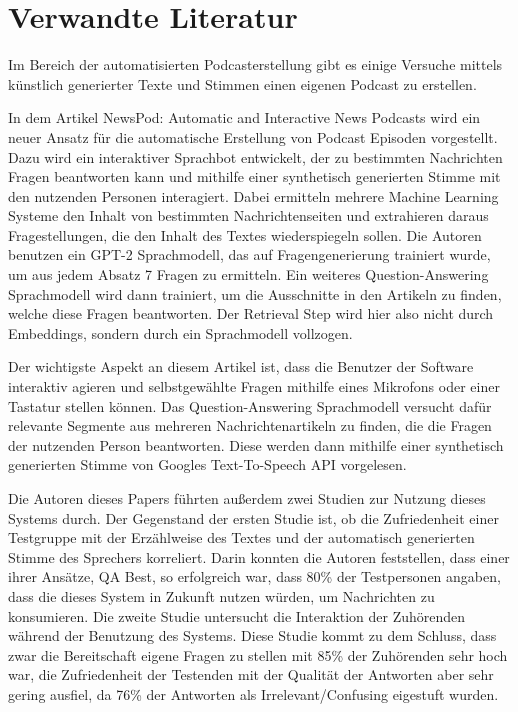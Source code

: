\chapter{Verwandte Literatur}\label{ch:theoretical}

Im Bereich der automatisierten Podcasterstellung gibt es einige Versuche mittels künstlich generierter Texte und Stimmen einen eigenen Podcast zu erstellen.

In dem Artikel \glqq NewsPod: Automatic and Interactive News Podcasts\grqq{} wird ein neuer Ansatz für die automatische Erstellung von Podcast Episoden vorgestellt. 
Dazu wird ein interaktiver Sprachbot entwickelt, der zu bestimmten Nachrichten Fragen beantworten kann und mithilfe einer synthetisch generierten Stimme mit den nutzenden Personen interagiert.
Dabei ermitteln mehrere Machine Learning Systeme den Inhalt von bestimmten Nachrichtenseiten und extrahieren daraus Fragestellungen, die den Inhalt des Textes wiederspiegeln sollen. 
Die Autoren benutzen ein GPT-2 Sprachmodell, das auf Fragengenerierung trainiert wurde, um aus jedem Absatz 7 Fragen zu ermitteln. 
Ein weiteres Question-Answering Sprachmodell wird dann trainiert, um die Ausschnitte in den Artikeln zu finden, welche diese Fragen beantworten.  
Der Retrieval Step wird hier also nicht durch Embeddings, sondern durch ein Sprachmodell vollzogen.

Der wichtigste Aspekt an diesem Artikel ist, dass die Benutzer der Software interaktiv agieren und selbstgewählte Fragen mithilfe eines Mikrofons oder einer Tastatur stellen können.
Das Question-Answering Sprachmodell versucht dafür relevante Segmente aus mehreren Nachrichtenartikeln zu finden, die die Fragen der nutzenden Person beantworten.
Diese werden dann mithilfe einer synthetisch generierten Stimme von Googles Text-To-Speech API vorgelesen.

Die Autoren dieses Papers führten außerdem zwei Studien zur Nutzung dieses Systems durch.
Der Gegenstand der ersten Studie ist, ob die Zufriedenheit einer Testgruppe mit der Erzählweise des Textes und der automatisch generierten Stimme des Sprechers korreliert. 
Darin konnten die Autoren feststellen, dass einer ihrer Ansätze, QA Best, so erfolgreich war, dass 80\% der Testpersonen angaben, dass die dieses System in Zukunft nutzen würden, um Nachrichten zu konsumieren.
Die zweite Studie untersucht die Interaktion der Zuhörenden während der Benutzung des Systems. 
Diese Studie kommt zu dem Schluss, dass zwar die Bereitschaft eigene Fragen zu stellen mit 85\% der Zuhörenden sehr hoch war, die Zufriedenheit der Testenden mit der Qualität der Antworten aber sehr gering ausfiel, da   76\% der Antworten als Irrelevant/Confusing eigestuft wurden. 
\cite{laban2022}


